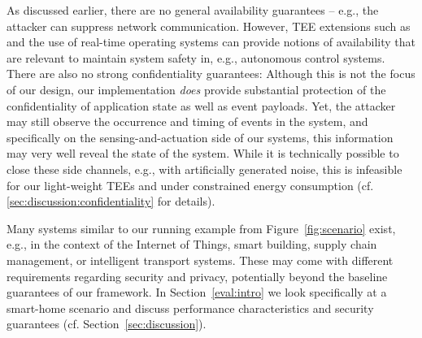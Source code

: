 As discussed earlier, there are no general availability guarantees -- e.g., the
attacker can suppress network communication. However, \ac{TEE} extensions such
as~\cite{alder_2021_aion} and the use of real-time operating systems can provide
notions of availability that are relevant to maintain system safety in, e.g.,
autonomous control systems. There are also no strong confidentiality guarantees:
Although this is not the focus of our design, our implementation \emph{does}
provide substantial protection of the confidentiality of application state as
well as event payloads. Yet, the attacker may still observe the occurrence and
timing of events in the system, and specifically on the sensing-and-actuation
side of our systems, this information may very well reveal the state of the
system. While it is technically possible to close these side channels, e.g.,
with artificially generated noise, this is infeasible for our light-weight
\acp{TEE} and under constrained energy consumption (cf.
\cref{sec:discussion:confidentiality} for details).

Many systems similar to our running example from Figure~\ref{fig:scenario}
exist, e.g., in the context of the Internet of Things, smart building, supply
chain management, or intelligent transport systems. These may come with
different requirements regarding security and privacy, potentially beyond the
baseline guarantees of our framework. In Section~\ref{eval:intro} we look
specifically at a smart-home scenario and discuss performance characteristics
and security guarantees (cf. Section~\ref{sec:discussion}).
